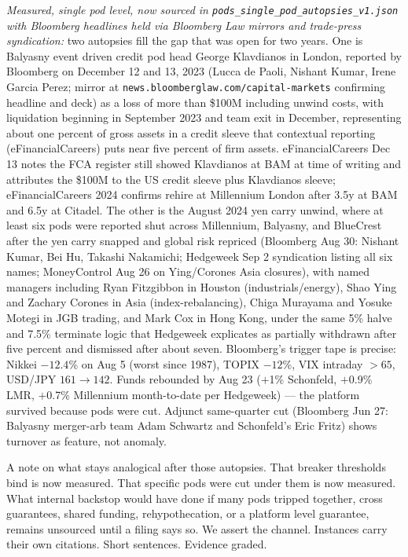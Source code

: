 \textit{Measured, single pod level, now sourced in \texttt{pods\_single\_pod\_autopsies\_v1.json} with Bloomberg headlines held via Bloomberg Law mirrors and trade-press syndication:} two autopsies fill the gap that was open for two years. One is Balyasny event driven credit pod head George Klavdianos in London, reported by Bloomberg on December 12 and 13, 2023 (Lucca de Paoli, Nishant Kumar, Irene Garcia Perez; mirror at \texttt{news.bloomberglaw.com/capital-markets} confirming headline and deck) as a loss of more than \$100M including unwind costs, with liquidation beginning in September 2023 and team exit in December, representing about one percent of gross assets in a credit sleeve that contextual reporting (eFinancialCareers) puts near five percent of firm assets. eFinancialCareers Dec 13 notes the FCA register still showed Klavdianos at BAM at time of writing and attributes the \$100M to the US credit sleeve plus Klavdianos sleeve; eFinancialCareers 2024 confirms rehire at Millennium London after 3.5y at BAM and 6.5y at Citadel. The other is the August 2024 yen carry unwind, where at least six pods were reported shut across Millennium, Balyasny, and BlueCrest after the yen carry snapped and global risk repriced (Bloomberg Aug 30: Nishant Kumar, Bei Hu, Takashi Nakamichi; Hedgeweek Sep 2 syndication listing all six names; MoneyControl Aug 26 on Ying/Corones Asia closures), with named managers including Ryan Fitzgibbon in Houston (industrials/energy), Shao Ying and Zachary Corones in Asia (index-rebalancing), Chiga Murayama and Yosuke Motegi in JGB trading, and Mark Cox in Hong Kong, under the same 5\% halve and 7.5\% terminate logic that Hedgeweek explicates as partially withdrawn after five percent and dismissed after about seven. Bloomberg's trigger tape is precise: Nikkei $-12.4$\% on Aug 5 (worst since 1987), TOPIX $-12$\%, VIX intraday $>65$, USD/JPY $161 \to 142$. Funds rebounded by Aug 23 ($+$1\% Schonfeld, $+$0.9\% LMR, $+$0.7\% Millennium month-to-date per Hedgeweek) — the platform survived because pods were cut. Adjunct same-quarter cut (Bloomberg Jun 27: Balyasny merger-arb team Adam Schwartz and Schonfeld's Eric Fritz) shows turnover as feature, not anomaly.

A note on what stays analogical after those autopsies. That breaker thresholds bind is now measured. That specific pods were cut under them is now measured. What internal backstop would have done if many pods tripped together, cross guarantees, shared funding, rehypothecation, or a platform level guarantee, remains unsourced until a filing says so. We assert the channel. Instances carry their own citations. Short sentences. Evidence graded.

